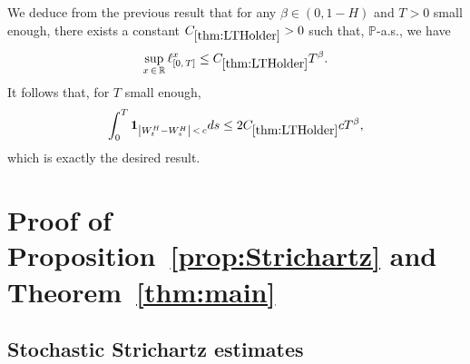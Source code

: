 \documentclass[10pt]{amsart}
\theoremstyle{definition}\newtheorem{defi}[theo]{Definition}\newtheorem{rema}[theo]{Remark}\newtheorem{exam}[theo]{Example}\newtheorem{exem}[theo]{Example}\newtheorem{nota}[theo]{Notation}
\newcommand{\bbP}{\mathbb{P}}
\newcommand{\bbR}{\mathbb{R}}
\newcommand{\bfun}{\mathbf{1}}
\begin{document}
We deduce from the previous result that for any $\beta\in (0,1-H)$ and $T>0$ small enough, there exists a constant $C_{\ref{thm:LTHolder}}>0$ such that, $\bbP$-a.s., we have
\[
\sup_{x\,\in\,\bbR} \ell^x_{[0,\,T]} \leq C_{\ref{thm:LTHolder}} T^{\beta}.
\]
It follows that, for $T$ small enough,
\[
\int_0^T \bfun_{\left|W_t^H-W_s^H\right|\,<\,c}ds \leq 2 C_{\ref{thm:LTHolder}} c T^{\beta},
\]
which is exactly the desired result.


\section{Proof of Proposition~\ref{prop:Strichartz} and Theorem~\ref{thm:main}}\label{sec:proofThmMain}

\subsection{Stochastic Strichartz estimates}
\end{document}
